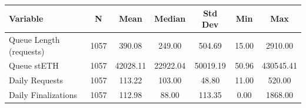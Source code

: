 {
\def\sym#1{\ifmmode^{#1}\else\(^{#1}\)\fi}
\begin{tabular}{l*{1}{cccccc}}
\toprule
Variable & N & Mean & Median & Std Dev & Min & Max \\
\midrule
Queue Length (requests) & 1057 &    390.08 &    249.00 &    504.69 &     15.00 &   2910.00 \\
Queue stETH & 1057 &  42028.11 &  22922.04 &  50019.19 &     50.96 & 430545.41 \\
Daily Requests & 1057 &    113.22 &    103.00 &     48.80 &     11.00 &    520.00 \\
Daily Finalizations & 1057 &    112.98 &     88.00 &    113.35 &      0.00 &   1868.00 \\
\bottomrule
\end{tabular}
}
